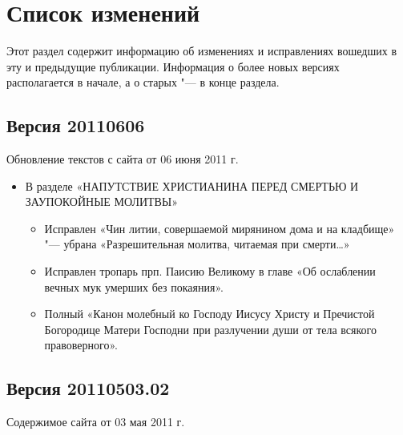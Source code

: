 \chapter*{Список изменений}

Этот раздел содержит информацию об изменениях и исправлениях вошедших в эту и предыдущие публикации. Информация о более новых версиях располагается в начале, а о старых "--- в конце раздела.
 

\small

\section*{Версия 20110606}

Обновление текстов с сайта от 06 июня 2011 г.
\begin{itemize}
\item В разделе «НАПУТСТВИЕ ХРИСТИАНИНА ПЕРЕД СМЕРТЬЮ И ЗАУПОКОЙНЫЕ МОЛИТВЫ»
\begin{itemize}
\item Исправлен «Чин литии, совершаемой мирянином дома и на кладбище» "--- убрана «Разрешительная молитва, читаемая при смерти\ldots»
\item Исправлен тропарь прп. Паисию Великому в главе «Об ослаблении вечных мук умерших без покаяния».
\item Полный «Канон молебный ко Господу Иисусу Христу и Пречистой Богородице Матери Господни при разлучении души от тела всякого правоверного».
\end{itemize}
\end{itemize}


\section*{Версия 20110503.02}
Содержимое сайта от 03 мая 2011 г.

\normalfont
